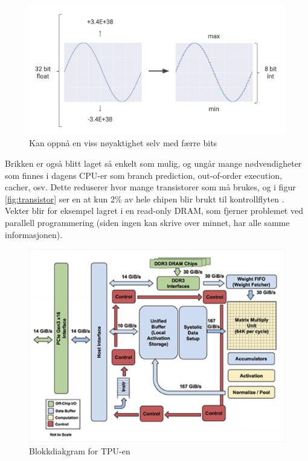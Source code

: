 \begin{figure}[t]
    \centering
    \includegraphics[width=\textwidth]{quantization.png}
    \caption{Kan oppnå en viss nøyaktighet selv med færre bits}
    \label{fig:quant}
\end{figure}

Brikken er også blitt laget så enkelt som mulig, og ungår mange nødvendigheter som finnes i dagens CPU-er som branch prediction, out-of-order execution, cacher, osv. Dette reduserer hvor mange transistorer som må brukes, og  i figur \ref{fig:transistor} ser en at kun 2\% av hele chipen blir brukt til kontrollflyten \cite{tpu_main}. Vekter blir for eksempel lagret i en read-only DRAM, som fjerner problemet ved parallell programmering (siden ingen kan skrive over minnet, har alle samme informasjonen).

\begin{figure}[ht]
    \centering
    \includegraphics[width=\textwidth]{tpu_block.jpg}
    \caption{Blokkdiakgram for TPU-en}
    \label{fig:blokk}
\end{figure}


